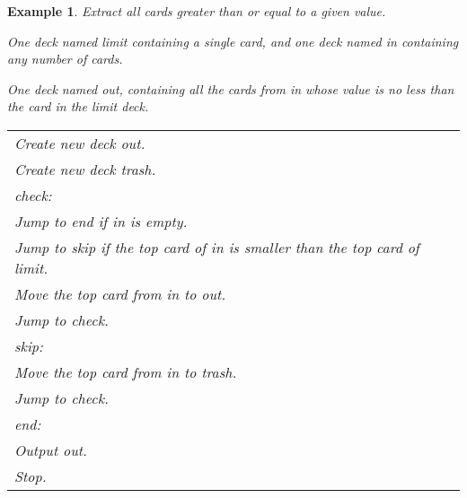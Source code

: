 \documentclass[a4paper,twoside]{tufte-handout}
\newtheorem{example}{Example}
\newcommand\lbl[1]{\hspace{-1em}\emph{#1:}}
\begin{document}
\begin{example}
  Extract all cards greater than or equal to a given value.
  \begin{description}
  \item[Input:] One deck named \emph{limit} containing a single card,
    and one deck named \emph{in} containing any number of cards.
  \item[Output:] One deck named \emph{out}, containing all the cards
    from \emph{in} whose value is no less than the card in the
    \emph{limit} deck.
 \item[Algorithm:]
  \item\normalfont
    \begin{tabular}{l}
      Create new deck \emph{out}.\\
      Create new deck \emph{trash}.\\
      \lbl{check}\\
      Jump to \emph{end} if \emph{in} is empty.\\
      Jump to \emph{skip} if the top card of \emph{in} is smaller than
      the top card of \emph{limit}.\\
      Move the top card from \emph{in} to \emph{out}.\\
      Jump to \emph{check}.\\
      \lbl{skip}\\
      Move the top card from \emph{in} to \emph{trash}.\\
      Jump to \emph{check}.\\
      \lbl{end}\\
      Output \emph{out}.\\
      Stop.
    \end{tabular}
  \end{description}
\end{example}
\end{document}
